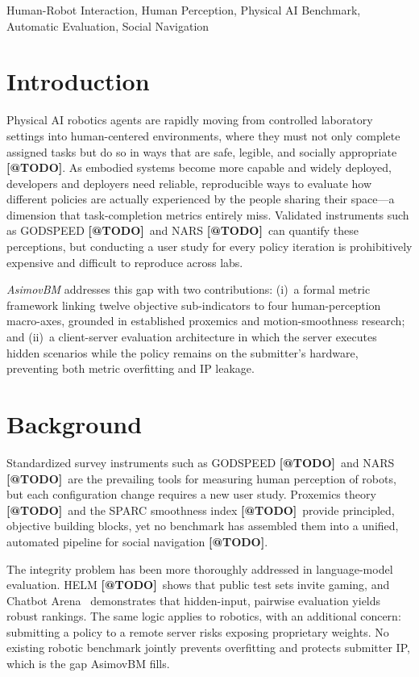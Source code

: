 \documentclass[conference]{IEEEtran}
\makeatletter
\newcommand{\tcite}{\textbf{[@TODO]}}
\makeatother
\begin{document}
\begin{IEEEkeywords}
Human-Robot Interaction, Human Perception, Physical AI Benchmark,
Automatic Evaluation, Social Navigation
\end{IEEEkeywords}

\section{Introduction}

Physical AI robotics agents are rapidly moving from controlled laboratory
settings into human-centered environments, where they must not only complete
assigned tasks but do so in ways that are safe, legible, and socially
appropriate \tcite.
As embodied systems become more capable and widely deployed, developers and
deployers need reliable, reproducible ways to evaluate how different policies
are actually experienced by the people sharing their space---a dimension that
task-completion metrics entirely miss.
Validated instruments such as GODSPEED \tcite\ and NARS \tcite\ can quantify
these perceptions, but conducting a user study for every policy iteration is
prohibitively expensive and difficult to reproduce across labs.

\textit{AsimovBM} addresses this gap with two contributions: (i)~a formal
metric framework linking twelve objective sub-indicators to four
human-perception macro-axes, grounded in established proxemics and
motion-smoothness research; and (ii)~a client-server evaluation architecture
in which the server executes hidden scenarios while the policy remains on
the submitter's hardware, preventing both metric overfitting and IP leakage.

\section{Background}

Standardized survey instruments such as GODSPEED \tcite\ and NARS \tcite\
are the prevailing tools for measuring human perception of robots, but each
configuration change requires a new user study.
Proxemics theory \tcite\ and the SPARC smoothness index \tcite\ provide
principled, objective building blocks, yet no benchmark has assembled them
into a unified, automated pipeline for social navigation \tcite.

The integrity problem has been more thoroughly addressed in language-model
evaluation.
HELM \tcite\ shows that public test sets invite gaming, and Chatbot Arena~\cite{10.5555/3692070.3692401}
demonstrates that hidden-input, pairwise evaluation yields robust
rankings.
The same logic applies to robotics, with an additional concern: submitting
a policy to a remote server risks exposing proprietary weights.
No existing robotic benchmark jointly prevents overfitting and protects
submitter IP, which is the gap AsimovBM fills.
\end{document}
